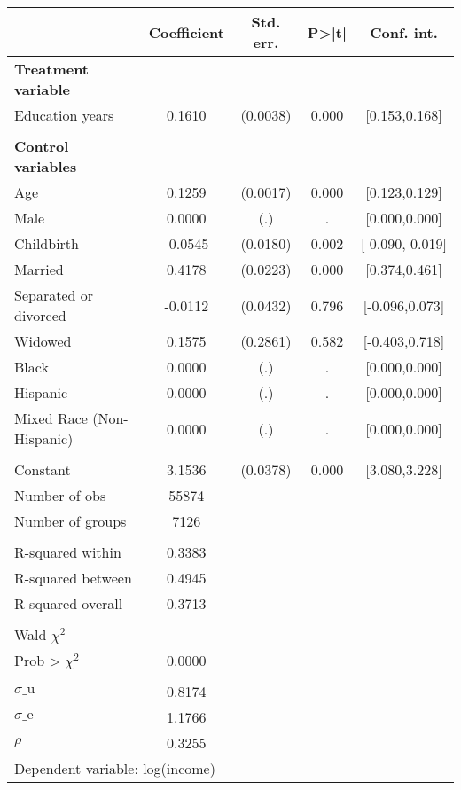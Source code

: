 {
\def\sym#1{\ifmmode^{#1}\else\(^{#1}\)\fi}
\begin{tabular}{l*{1}{cccc}}
\toprule
                    & Coefficient&   Std. err.&       P>|t|&  Conf. int.\\
\midrule
\textbf{Treatment variable}&            &            &            &            \\
Education years     &      0.1610&    (0.0038)&       0.000&[0.153,0.168]\\
\\ \textbf{Control variables}&            &            &            &            \\
Age                 &      0.1259&    (0.0017)&       0.000&[0.123,0.129]\\
Male                &      0.0000&         (.)&           .&[0.000,0.000]\\
Childbirth          &     -0.0545&    (0.0180)&       0.002&[-0.090,-0.019]\\
Married             &      0.4178&    (0.0223)&       0.000&[0.374,0.461]\\
Separated or divorced&     -0.0112&    (0.0432)&       0.796&[-0.096,0.073]\\
Widowed             &      0.1575&    (0.2861)&       0.582&[-0.403,0.718]\\
Black               &      0.0000&         (.)&           .&[0.000,0.000]\\
Hispanic            &      0.0000&         (.)&           .&[0.000,0.000]\\
Mixed Race (Non-Hispanic)&      0.0000&         (.)&           .&[0.000,0.000]\\
                    &            &            &            &            \\
Constant            &      3.1536&    (0.0378)&       0.000&[3.080,3.228]\\
\midrule
Number of obs       &       55874&            &            &            \\
Number of groups    &        7126&            &            &            \\
\\ R-squared within &      0.3383&            &            &            \\
R-squared between   &      0.4945&            &            &            \\
R-squared overall   &      0.3713&            &            &            \\
\\ Wald $\chi^2$    &            &            &            &            \\
Prob > $\chi^2$     &      0.0000&            &            &            \\
\\ $\sigma\text{\_u}$&      0.8174&            &            &            \\
$\sigma\text{\_e}$   &      1.1766&            &            &            \\
$\rho$              &      0.3255&            &            &            \\
\bottomrule
\multicolumn{5}{l}{\footnotesize Dependent variable: log(income)}\\
\end{tabular}
}
